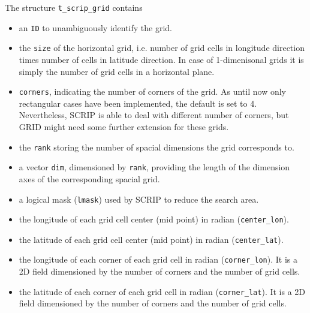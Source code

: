\documentclass[11pt,twoside]{article}
\begin{document}
The structure \verb|t_scrip_grid| contains
\begin{itemize} 
\item an \verb|ID| to unambiguously identify the grid.
\item the \verb|size| of the horizontal grid,
i.e. number of grid cells in longitude direction times  number of cells in
 latitude direction. In case of 1-dimenisonal grids it is simply the
 number of grid cells in a horizontal plane.
\item \verb|corners|, indicating the number of corners of the grid. As
 until now only rectangular cases have been implemented, the default is
 set  to 4. Nevertheless, SCRIP is able to deal with different number
 of corners, but GRID might need some further extension for these grids.
\item the \verb|rank| storing the number of spacial dimensions the
 grid corresponds to.
\item a vector \verb|dim|, dimensioned by \verb|rank|, providing the length
 of the dimension axes of the corresponding spacial grid.
\item a logical mask (\verb|lmask|) used by SCRIP to reduce the search area. 
\item the longitude of each grid cell center (mid point) in radian (\verb|center_lon|).
\item  the latitude of each grid  cell
center (mid point) in radian (\verb|center_lat|).
\item the longitude of each corner of each
grid cell in radian (\verb|corner_lon|). It is a 2D field dimensioned by the
number of corners and the number of grid cells.
\item  the latitude of each corner of each
grid cell in radian (\verb|corner_lat|). It is a 2D field dimensioned by the
number of corners and the number of grid cells.
\end{itemize}
\end{document}
